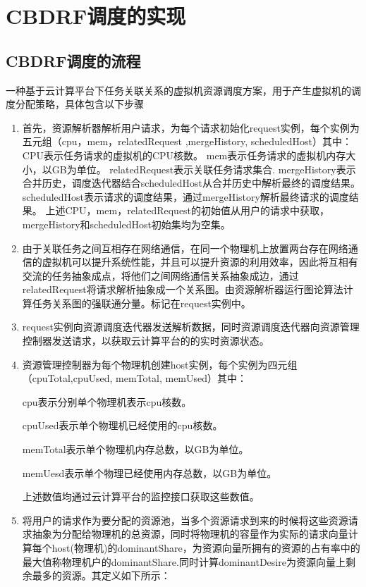 \section{CBDRF调度的实现}

\subsection{CBDRF调度的流程}
一种基于云计算平台下任务关联关系的虚拟机资源调度方案，用于产生虚拟机的调度分配策略，具体包含以下步骤
\begin{enumerate}
\item 首先，资源解析器解析用户请求，为每个请求初始化request实例，每个实例为五元组（cpu，mem，relatedRequest ,mergeHistory, scheduledHost）其中：
CPU表示任务请求的虚拟机的CPU核数。
mem表示任务请求的虚拟机内存大小，以GB为单位。
relatedRequest表示关联任务请求集合.
mergeHistory表示合并历史，调度迭代器结合scheduledHost从合并历史中解析最终的调度结果。
scheduledHost表示请求的调度结果，通过mergeHistory解析最终请求的调度结果。
上述CPU，mem，relatedRequest的初始值从用户的请求中获取，mergeHistory和scheduledHost初始集均为空集。

\item 由于关联任务之间互相存在网络通信，在同一个物理机上放置两台存在网络通信的虚拟机可以提升系统性能，并且可以提升资源的利用效率，因此将互相有交流的任务抽象成点，将他们之间网络通信关系抽象成边，通过relatedRequest将请求解析抽象成一个关系图。由资源解析器运行图论算法计算任务关系图的强联通分量。标记在request实例中。

\item request实例向资源调度迭代器发送解析数据，同时资源调度迭代器向资源管理控制器发送请求，以获取云计算平台的的实时资源状态。

\item 资源管理控制器为每个物理机创建host实例，每个实例为四元组（cpuTotal,cpuUsed, memTotal, memUsed）其中：

cpu表示分别单个物理机表示cpu核数。

cpuUsed表示单个物理机已经使用的cpu核数。

memTotal表示单个物理机内存总数，以GB为单位。

memUesd表示单个物理已经使用内存总数，以GB为单位。

上述数值均通过云计算平台的监控接口获取这些数值。

\item 将用户的请求作为要分配的资源池，当多个资源请求到来的时候将这些资源请求抽象为分配给物理机的总资源，同时将物理机的容量作为实际的请求向量计算每个host(物理机)的dominantShare，为资源向量所拥有的资源的占有率中的最大值称物理机户的dominantShare.同时计算dominantDesire为资源向量上剩余最多的资源。其定义如下所示：


\end{enumerate}
